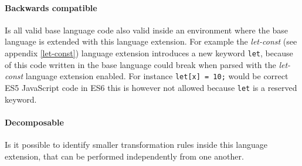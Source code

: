 \paragraph{Backwards compatible}
Is all valid base language code also valid inside an environment where the base language is extended with this language extension. For example the \textit{let-const} (see appendix \ref{let-const}) language extension introduces a new keyword \lstinline$let$, because of this code written in the base language could break when parsed with the \textit{let-const} language extension enabled. For instance \lstinline$let[x] = 10;$ would be correct ES5 JavaScript code in ES6 this is however not allowed because \lstinline$let$ is a reserved keyword.

\paragraph{Decomposable}
Is it possible to identify smaller transformation rules inside this language extension, that can be performed independently from one another.

